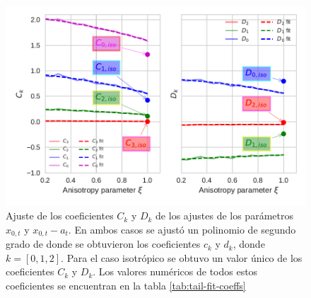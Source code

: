 \begin{figure}
  \centering
  \includegraphics[width=0.8\linewidth]{./Figures/tail_params_fit}
  \caption{Ajuste de los coeficientes $C_k$ y $D_k$ de los ajustes de los parámetros $x_{0,t}$ y $x_{0,t} - a_t$. En ambos casos se ajustó un polinomio de segundo grado de donde se obtuvieron los coeficientes $c_k$ y $d_k$, donde $k=[0, 1, 2]$. Para el caso isotrópico se obtuvo un valor único de los coeficientes $C_k$ y $D_k$. Los valores numéricos de todos estos coeficientes se encuentran en la tabla \ref{tab:tail-fit-coeffs}}
  \label{fig:fit-2}
\end{figure}

  
